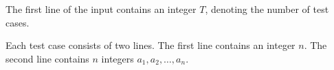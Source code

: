 The first line of the input contains an integer $T$, denoting the number of test cases. 

Each test case consists of two lines.
The first line contains an integer $n$.
The second line contains $n$ integers $a_1,a_2,\ldots,a_n$.